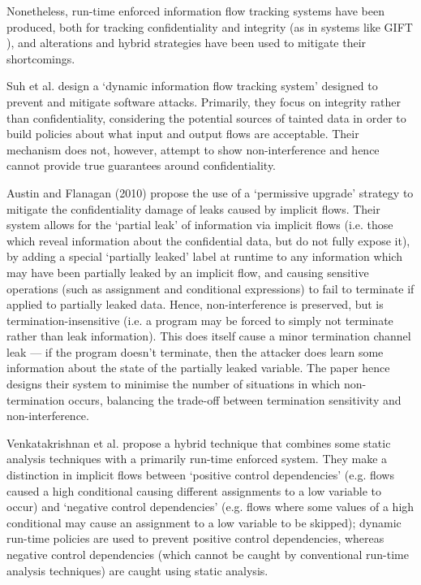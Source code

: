Nonetheless, run-time enforced information flow tracking systems have been produced, both for tracking confidentiality and integrity (as in systems like GIFT \cite{lam2006dynamicintegrity}), and alterations and hybrid strategies have been used to mitigate their shortcomings.

Suh et al. \cite{suh2004dynamicintegrity} design a `dynamic information flow tracking system' designed to prevent and mitigate software attacks. Primarily, they focus on integrity rather than confidentiality, considering the potential sources of tainted data in order to build policies about what input and output flows are acceptable. Their mechanism does not, however, attempt to show non-interference and hence cannot provide true guarantees around confidentiality.

Austin and Flanagan (2010) \cite{austin2010runtime} propose the use of a `permissive upgrade' strategy to mitigate the confidentiality damage of leaks caused by implicit flows. Their system allows for the `partial leak' of information via implicit flows (i.e. those which reveal information about the confidential data, but do not fully expose it), by adding a special `partially leaked' label at runtime to any information which may have been partially leaked by an implicit flow, and causing sensitive operations (such as assignment and conditional expressions) to fail to terminate if applied to partially leaked data. Hence, non-interference is preserved, but is termination-insensitive (i.e. a program may be forced to simply not terminate rather than leak information). This does itself cause a minor termination channel leak --- if the program doesn't terminate, then the attacker does learn some information about the state of the partially leaked variable. The paper hence designs their system to minimise the number of situations in which non-termination occurs, balancing the trade-off between termination sensitivity and non-interference.

Venkatakrishnan et al. \cite{venkatakrishnan2006runtime} propose a hybrid technique that combines some static analysis techniques with a primarily run-time enforced system. They make a distinction in implicit flows between `positive control dependencies' (e.g. flows caused a high conditional causing different assignments to a low variable to occur) and `negative control dependencies' (e.g. flows where some values of a high conditional may cause an assignment to a low variable to be skipped); dynamic run-time policies are used to prevent positive control dependencies, whereas negative control dependencies (which cannot be caught by conventional run-time analysis techniques) are caught using static analysis.

